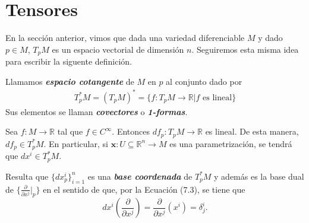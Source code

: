 
\section{Tensores}

\begin{observation}
En la secci\'on anterior, vimos que dada una variedad diferenciable $M$ y dado $p\in M$, 
$T_pM$ es un espacio vectorial de dimensi\'on $n$. Seguiremos esta misma idea para escribir la siguente definici\'on.   
\end{observation}

\begin{definition}
Llamamos \textit{\textbf{espacio cotangente}} de $M$ en $p$ al conjunto dado por 
\begin{align*}
    T_p^{*}M=(T_pM)^{*}=\{f\colon T_pM\to\mathbb{R}|\text{$f$ es lineal}\}
\end{align*}
Sus elementos se llaman \textit{\textbf{covectores}} o \textit{\textbf{1-formas}}.
\end{definition}

\begin{example}
Sea $f\colon M\to\mathbb{R}$ tal que $f\in C^\infty$. Entonces $df_p\colon T_pM\to\mathbb{R}$ es lineal. De esta manera, $df_p\in T_p^{*}M$. En particular, si $\mathbf{x}\colon U\subseteq\mathbb{R}^n\to M$ es una parametrizaci\'on, se tendr\'a que $dx^i\in T_p^{*}M$.   

Resulta que $\{dx_p^i\}_{i=1}^{n}$ es una \textit{\textbf{base coordenada}} de $T_p^{*}M$ y adem\'as es la base dual de $\{\frac{\partial}{\partial x^j}|_p\}$ en el sentido de que, por la Ecuaci\'on (7.3), se tiene que 
\begin{equation*}
    dx^i\left(\frac{\partial}{\partial x^j}\right)=\frac{\partial}{\partial x^j}(x^i)=\delta_j^i.
\end{equation*}
\end{example}

